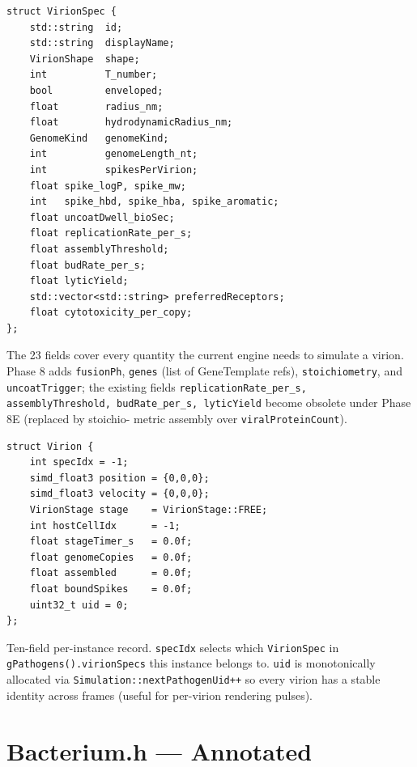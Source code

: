 \documentclass[11pt,letterpaper,twoside,openany]{book}
\newcommand{\code}[1]{\texttt{#1}}
\begin{document}
\begin{lstlisting}
struct VirionSpec {
    std::string  id;
    std::string  displayName;
    VirionShape  shape;
    int          T_number;
    bool         enveloped;
    float        radius_nm;
    float        hydrodynamicRadius_nm;
    GenomeKind   genomeKind;
    int          genomeLength_nt;
    int          spikesPerVirion;
    float spike_logP, spike_mw;
    int   spike_hbd, spike_hba, spike_aromatic;
    float uncoatDwell_bioSec;
    float replicationRate_per_s;
    float assemblyThreshold;
    float budRate_per_s;
    float lyticYield;
    std::vector<std::string> preferredReceptors;
    float cytotoxicity_per_copy;
};
\end{lstlisting}
The 23 fields cover every quantity the current engine needs to
simulate a virion. Phase 8 adds \code{fusionPh}, \code{genes}
(list of GeneTemplate refs), \code{stoichiometry}, and
\code{uncoatTrigger}; the existing fields
\code{replicationRate\_per\_s, assemblyThreshold, budRate\_per\_s,
lyticYield} become obsolete under Phase 8E (replaced by stoichio-
metric assembly over \code{viralProteinCount}).

\begin{lstlisting}
struct Virion {
    int specIdx = -1;
    simd_float3 position = {0,0,0};
    simd_float3 velocity = {0,0,0};
    VirionStage stage    = VirionStage::FREE;
    int hostCellIdx      = -1;
    float stageTimer_s   = 0.0f;
    float genomeCopies   = 0.0f;
    float assembled      = 0.0f;
    float boundSpikes    = 0.0f;
    uint32_t uid = 0;
};
\end{lstlisting}
Ten-field per-instance record. \code{specIdx} selects which
\code{VirionSpec} in \code{gPathogens().virionSpecs} this instance
belongs to. \code{uid} is monotonically allocated via
\code{Simulation::nextPathogenUid++} so every virion has a stable
identity across frames (useful for per-virion rendering pulses).

\chapter{Bacterium.h --- Annotated}
\label{ch:bact-line}
\end{document}

